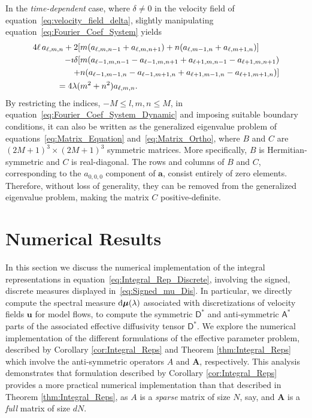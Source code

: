 \documentclass[leqno,onefignum,onetabnum]{siamltex1213}
\renewcommand{\d}{\mathrm{d}}
\newcommand{\Ab}{\mathbf{A}}
\newcommand{\Dm}{\mathsf{D}}
\newcommand{\Am}{\mathsf{A}}
\newcommand\bmu{\mbox{\boldmath${\mu}$}}
\newcommand{\veca}{\boldsymbol{a}}
\newcommand{\vecu}{\boldsymbol{u}}
\begin{document}
In the \emph{time-dependent} case, where $\delta\neq0$ in the velocity field
of equation~\eqref{eq:velocity_field_delta}, slightly manipulating
equation~\eqref{eq:Fourier_Coef_System} yields  
%
\begin{align}\label{eq:Fourier_Coef_System_Dynamic}
4\ell\,a_{\ell,m,n}
+2[&m(a_{\ell,m,n-1}+a_{\ell,m,n+1})+n(a_{\ell,m-1,n}+a_{\ell,m+1,n})]
\notag\\
-\imath\delta[&m(a_{\ell-1,m,n-1}-a_{\ell-1,m,n+1}+a_{\ell+1,m,n-1}-a_{\ell+1,m,n+1})\notag\\
    +&n(a_{\ell-1,m-1,n}-a_{\ell-1,m+1,n}+a_{\ell+1,m-1,n}-a_{\ell+1,m+1,n})] 
\notag\\
=4\lambda(&m^2+n^2)a_{\ell,m,n}.
\end{align}
%
By restricting the indices, $-M\leq l,m,n\leq M$, in
equation~\eqref{eq:Fourier_Coef_System_Dynamic} and imposing suitable
boundary  
conditions, it can also be
written as the generalized eigenvalue problem of
equations~\eqref{eq:Matrix_Equation} and~\eqref{eq:Matrix_Ortho},
where  $B$ and 
$C$ are $(2M+1)^3\times(2M+1)^3$ symmetric matrices. More specifically,
$B$ is Hermitian-symmetric and $C$ is real-diagonal. The rows and
columns of $B$ and $C$, corresponding to the $a_{0,0,0}$ component of
$\veca$, consist entirely of zero elements. Therefore, without loss
of generality, they can be removed from the generalized eigenvalue
problem, making the matrix $C$ positive-definite.  







\section{Numerical Results}\label{sec:Num_Results}
%
In this section we discuss the numerical implementation of the
integral representations in equation~\eqref{eq:Integral_Rep_Discrete},
involving the signed, discrete measures displayed
in~\eqref{eq:Signed_mu_Dis}. In particular, we directly compute the 
spectral measure $\d\bmu(\lambda)$ associated with discretizations of
velocity fields $\vecu $ for model flows, to compute the symmetric
$\Dm^*$ and anti-symmetric $\Am^*$ parts of the associated
effective diffusivity tensor $\Dm^*$. We explore the numerical
implementation of the different formulations of the effective
parameter problem, described by Corollary \ref{cor:Integral_Reps} and
Theorem \ref{thm:Integral_Reps} which involve the anti-symmetric
operators $A$ and $\Ab$, respectively. This analysis demonstrates that
formulation described by Corollary \ref{cor:Integral_Reps} provides a
more practical numerical implementation than that described in Theorem
\ref{thm:Integral_Reps}, as $A$ is a \emph{sparse} matrix of size $N$,
say, and $\Ab$ is a \emph{full} matrix of size $dN$.    
\end{document}
